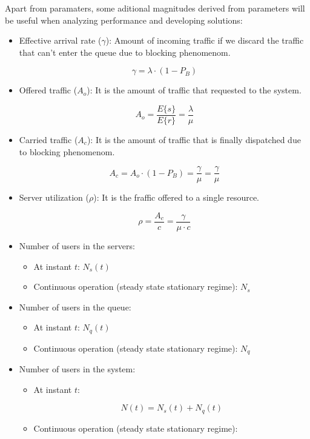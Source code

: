 \documentclass[../main.tex]{subfiles}
\begin{document}
Apart from paramaters, some aditional magnitudes derived from parameters will be useful when analyzing performance and developing solutions:

\begin{itemize}
	\item {
		Effective arrival rate ($\gamma$): Amount of incoming traffic if we discard the traffic that can't enter the queue due to blocking phenomenom.

		$$ \gamma = \lambda \cdot ( 1 - P_B ) $$
	}
	\item {
		Offered traffic ($A_o$): It is the amount of traffic that requested to the system.

		$$ A_o = \frac {E\{s\}} {E\{r\}} = \frac {\lambda} {\mu} $$
	}
	\item {
		Carried traffic ($A_c$): It is the amount of traffic that is finally dispatched due to blocking phenomenom.

		$$ A_c = A_o \cdot ( 1 - P_B ) = \frac {\gamma} {\mu} = \frac {\gamma} {\mu} $$
	}
	\item {
		Server utilization ($\rho$): It is the fraffic offered to a single resource.

		$$ \rho = \frac {A_c} {c} = \frac {\gamma} {\mu \cdot c} $$
	}
	\item {
		Number of users in the servers:

		\begin{itemize}
			\item {
				At instant $t$: $N_s(t)$
			}
			\item {
				Continuous operation (steady state stationary regime): $N_s$
			}
		\end{itemize}
	}
	\item {
		Number of users in the queue:

		\begin{itemize}
			\item {
				At instant $t$: $N_q(t)$
			}
			\item {
				Continuous operation (steady state stationary regime): $N_q$
			}
		\end{itemize}
	}
	\item {
		Number of users in the system:

		\begin{itemize}
			\item {
				At instant $t$:

				$$ N(t) = N_s(t) + N_q(t) $$
			}
			\item {
				Continuous operation (steady state stationary regime):

}
\end{itemize}}
\end{itemize}
\end{document}
